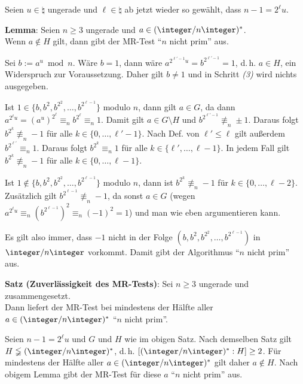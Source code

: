 \linie

Seien $u \in \natural$ ungerade und
$\ell \in \natural$ ab jetzt wieder so gewählt, dass $n-1 = 2^\ell u$.

\textbf{Lemma}:
Seien $n \ge 3$ ungerade und $a \in (\ZnZ)^\ast$.\\
Wenn $a \notin H$ gilt, dann gibt der MR-Test "`$n$ nicht prim"' aus.

\begin{Beweis}
    Sei $b := a^u \bmod n$.
    Wäre $b = 1$, dann wäre $a^{2^{\ell'-1} u} = b^{2^{\ell'-1}} = 1$,
    d.\,h. $a \in H$, ein Widerspruch zur Voraussetzung.
    Daher gilt $b \not= 1$ und in Schritt \emph{(3)} wird nichts ausgegeben.

    Ist $1 \in \{b, b^2, b^{2^2}, \dotsc, b^{2^{\ell-1}}\}$ modulo $n$,
    dann gilt $a \in G$,
    da dann $a^{2^\ell u} = (a^u)^{2^\ell} \equiv_n b^{2^\ell} \equiv_n 1$.
    Damit gilt $a \in G \setminus H$ und
    $b^{2^{\ell'-1}} \not\equiv_n \pm 1$.
    Daraus folgt $b^{2^k} \not\equiv_n -1$ für alle $k \in \{0, \dotsc, \ell' - 1\}$.
    Nach Def. von $\ell' \le \ell$ gilt außerdem $b^{2^{\ell'}} \equiv_n 1$.
    Daraus folgt $b^{2^k} \equiv_n 1$ für alle $k \in \{\ell', \dotsc, \ell - 1\}$.
    In jedem Fall gilt $b^{2^k} \not\equiv_n -1$ für alle $k \in \{0, \dotsc, \ell - 1\}$.

    Ist $1 \notin \{b, b^2, b^{2^2}, \dotsc, b^{2^{\ell-1}}\}$ modulo $n$,
    dann ist $b^{2^k} \not\equiv_n -1$ für $k \in \{0, \dotsc, \ell-2\}$.
    Zusätzlich gilt $b^{2^{\ell-1}} \not\equiv_n -1$,
    da sonst $a \in G$
    (wegen $a^{2^\ell u} \equiv_n (b^{2^{\ell-1}})^2 \equiv_n (-1)^2 = 1$)
    und man wie eben argumentieren kann.

    Es gilt also immer, dass $-1$ nicht in der Folge $(b, b^2, b^{2^2}, \dotsc, b^{2^{\ell-1}})$
    in $\ZnZ$ vorkommt.
    Damit gibt der Algorithmus "`$n$ nicht prim"' aus.
\end{Beweis}

\linie

\textbf{Satz (Zuverlässigkeit des MR-Tests)}:
Sei $n \ge 3$ ungerade und zusammengesetzt.\\
Dann liefert der MR-Test bei mindestens der Hälfte aller $a \in (\ZnZ)^\ast$
"`$n$ nicht prim"'.

\begin{Beweis}
    Seien $n-1 = 2^\ell u$ und $G$ und $H$ wie im obigen Satz.
    Nach demselben Satz gilt $H \lneqq (\ZnZ)^\ast$,
    d.\,h. $[(\ZnZ)^\ast : H] \ge 2$.
    Für mindestens der Hälfte aller $a \in (\ZnZ)^\ast$ gilt daher $a \notin H$.
    Nach obigem Lemma gibt der MR-Test für diese $a$ "`$n$ nicht prim"' aus.
\end{Beweis}

